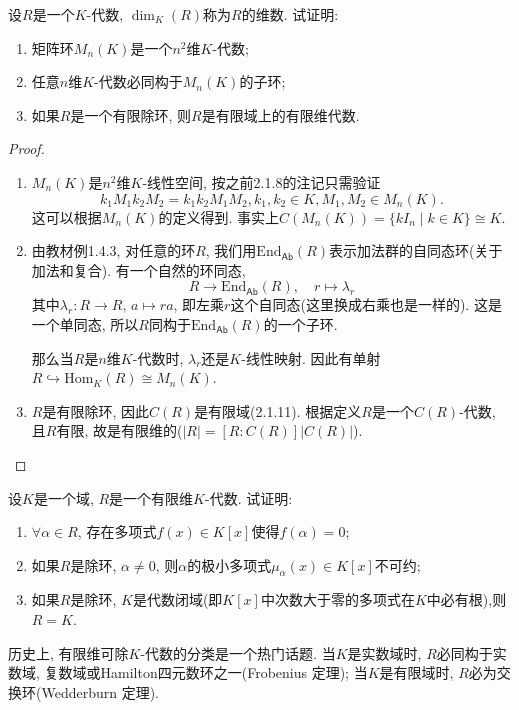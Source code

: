 \documentclass{../solutions-cn}
\begin{document}
\begin{exercise}[习题2.1.13]
    设$R$是一个$K$-代数, $\dim_K(R)$称为$R$的维数. 试证明: 
    \begin{enumerate}[(1)]
        \item 矩阵环$M_n(K)$是一个$n^2$维$K$-代数;
        \item 任意$n$维$K$-代数必同构于$M_n(K)$的子环;
        \item 如果$R$是一个有限除环, 则$R$是有限域上的有限维代数.
    \end{enumerate}
\end{exercise}

\begin{proof}
    \begin{enumerate}[(1)]
        \item $M_n(K)$是$n^2$维$K$-线性空间, 按之前2.1.8的注记只需验证
        \[
            k_1M_1k_2M_2 = k_1k_2M_1M_2, k_1, k_2 \in K, M_1, M_2 \in M_n(K).
        \]
        这可以根据$M_n(K)$的定义得到. 事实上$C(M_n(K)) = \{kI_n \mid k \in K\} \cong K$.
        \item 由教材例1.4.3, 对任意的环$R$, 我们用$\mathrm{End}_{\mathsf{Ab}}(R)$表示加法群的自同态环(关于加法和复合). 有一个自然的环同态,
        \[
            R \to \mathrm{End}_{\mathsf{Ab}}(R),\quad r \mapsto \lambda_r
        \]
        其中$\lambda_r: R \to R,\, a \mapsto ra$, 即左乘$r$这个自同态(这里换成右乘也是一样的). 这是一个单同态, 所以$R$同构于$\mathrm{End}_{\mathsf{Ab}}(R)$的一个子环.

        那么当$R$是$n$维$K$-代数时, $\lambda_r$还是$K$-线性映射. 因此有单射$R \hookrightarrow \mathrm{Hom}_K(R) \cong M_n(K)$.
        \item $R$是有限除环, 因此$C(R)$是有限域(2.1.11). 根据定义$R$是一个$C(R)$-代数, 且$R$有限, 故是有限维的($|R| = [R:C(R)]|C(R)|$).
    \end{enumerate}
\end{proof}

\begin{exercise}[习题2.1.14]
    设$K$是一个域, $R$是一个有限维$K$-代数. 试证明: 
    \begin{enumerate}[(1)]
        \item $\forall \alpha \in R$, 存在多项式$f(x) \in K[x]$使得$f(\alpha) = 0$;
        \item 如果$R$是除环, $\alpha \neq 0$, 则$\alpha$的极小多项式$\mu_\alpha(x) \in K[x]$不可约;
        \item 如果$R$是除环, $K$是代数闭域(即$K[x]$中次数大于零的多项式在$K$中必有根),则$R = K$.
    \end{enumerate}
    历史上, 有限维可除$K$-代数的分类是一个热门话题. 当$K$是实数域时, $R$必同构于实数域, 复数域或Hamilton四元数环之一(Frobenius 定理); 当$K$是有限域时, $R$必为交换环(Wedderburn 定理).
\end{exercise}
\end{document}
